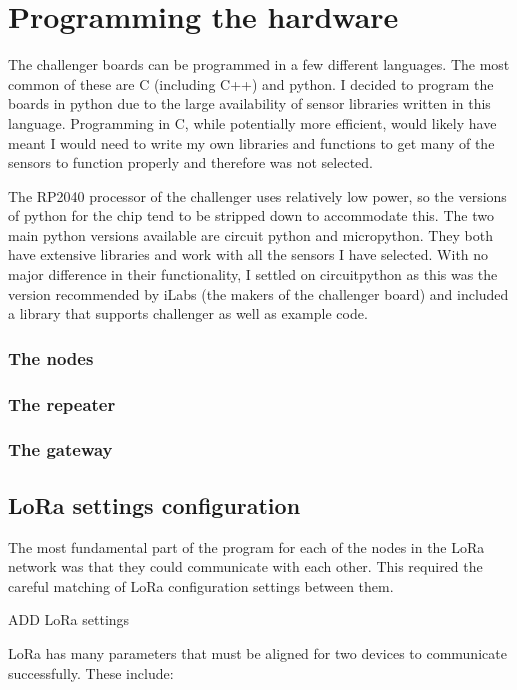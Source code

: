 \section{Programming the hardware}

The challenger boards can be programmed in a few different languages. The most
common of these are C (including C++) and python. I decided to program the
boards in python due to the large availability of sensor libraries written in
this language. Programming in C, while potentially more efficient, would likely
have meant I would need to write my own libraries and functions to get many of
the sensors to function properly and therefore was not selected.

The RP2040 processor of the challenger uses relatively low power, so the
versions of python for the chip tend to be stripped down to accommodate this.
The two main python versions available are circuit python and micropython. They
both have extensive libraries and work with all the sensors I have selected.
With no major difference in their functionality, I settled on circuitpython as
this was the version recommended by iLabs (the makers of the challenger board)
and included a library that supports challenger as well as example code.

\subsubsection{The nodes}

\subsubsection{The repeater}

\subsubsection{The gateway}

\subsection{LoRa settings configuration}

The most fundamental part of the program for each of the nodes in the LoRa
network was that they could communicate with each other. This required the
careful matching of LoRa configuration settings between them.

  {ADD LoRa settings}

LoRa has many parameters that must be aligned for two devices to communicate
successfully. These include:

